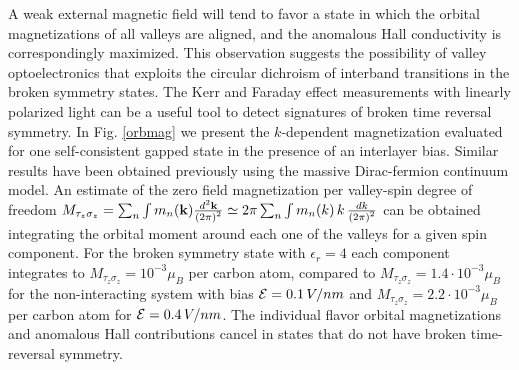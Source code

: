 \documentclass[twocolumn,prb,showpacs,preprintnumbers,amsmath,amssymb]{revtex4}
\begin{document}
A weak external magnetic field will tend to favor a state in which the orbital magnetizations of 
all valleys are aligned, and the anomalous Hall conductivity is correspondingly maximized.
This observation suggests
the possibility of valley optoelectronics that exploits the circular dichroism of 
interband transitions \cite{dichro} in the broken symmetry states.
The Kerr and Faraday effect measurements with linearly polarized light
can be a useful tool to detect signatures of broken time reversal symmetry.
\cite{kerr}
In Fig. \ref{orbmag} we present the $k$-dependent magnetization evaluated 
for one self-consistent gapped state in the presence of an interlayer bias.
Similar results have been obtained previously using the massive Dirac-fermion continuum model. 
An estimate of the zero field magnetization per valley-spin degree of freedom 
$M_{\tau_z \sigma_z} = \sum_n \int  m_n({\bf k}) \frac{d^2 {\bf k}}{\left( 2 \pi \right)^2}    
\simeq 2 \pi \sum_n \int   m_n(k) \, k \, \frac{dk}{\left( 2 \pi \right)^2}$ 
can be obtained integrating the orbital moment around each one of the valleys
for a given spin component. 
For the broken symmetry state with $\epsilon_r = 4$
each component integrates to $M_{\tau_z \sigma_z} =  10^{-3} \mu_B$ per carbon atom, compared to 
$M_{\tau_z \sigma_z} = 1.4 \cdot 10^{-3} \mu_{B}$ 
for the non-interacting system with bias ${\cal E} = 0.1 \,V/nm$ and 
$M_{\tau_z \sigma_z} = 2.2 \cdot 10^{-3} \mu_{B}$ per carbon atom for ${\cal E } = 0.4 \,V/nm$.
The individual flavor orbital magnetizations and  
anomalous Hall contributions cancel in states that do not have broken time-reversal symmetry.
\end{document}
